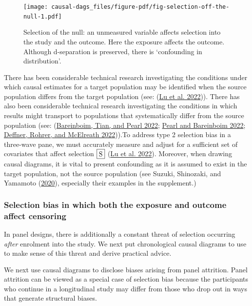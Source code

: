 \documentclass[
  singlecolumn]{article}
\begin{document}
\begin{figure}

{\centering \texttt{[image: causal-dags\_files/figure-pdf/fig-selection-off-the-null-1.pdf]}

}

\caption{\label{fig-selection-off-the-null}Selection of the null: an
unmeasured variable affects selection into the study and the outcome.
Here the exposure affects the outcome. Although d-separation is
preserved, there is `confounding in distribution'.}

\end{figure}

There has been considerable technical research investigating the
conditions under which causal estimates for a target population may be
identified when the source population differs from the target population
(see: (\protect\hyperlink{ref-lu2022}{Lu et al. 2022})). There has also
been considerable technical research investigating the conditions in
which results might transport to populations that systematically differ
from the source population (see:
(\protect\hyperlink{ref-bareinboim2022}{Bareinboim, Tian, and Pearl
2022}; \protect\hyperlink{ref-pearl2022}{Pearl and Bareinboim 2022};
\protect\hyperlink{ref-deffner2022}{Deffner, Rohrer, and McElreath
2022})).To address type 2 selection bias in a three-wave pane, we must
accurately measure and adjust for a sufficient set of covariates that
affect selection \(\framebox{S}\) (\protect\hyperlink{ref-lu2022}{Lu et
al. 2022}). Moreover, when drawing causal diagrams, it is vital to
present confounding as it is assumed to exist in the target population,
not the source population (see Suzuki, Shinozaki, and Yamamoto
(\protect\hyperlink{ref-suzuki2020}{2020}), especially their examples in
the supplement.)

\hypertarget{selection-bias-in-which-both-the-exposure-and-outcome-affect-censoring}{%
\subsubsection{Selection bias in which both the exposure and outcome
affect
censoring}\label{selection-bias-in-which-both-the-exposure-and-outcome-affect-censoring}}

In panel designs, there is additionally a constant threat of selection
occurring \emph{after} enrolment into the study. We next put
chronological causal diagrams to use to make sense of this threat and
derive practical advice.

We next use causal diagrams to disclose biases arising from panel
attrition. Panel attrition can be viewed as a special case of selection
bias because the participants who continue in a longitudinal study may
differ from those who drop out in ways that generate structural biases.
\end{document}
